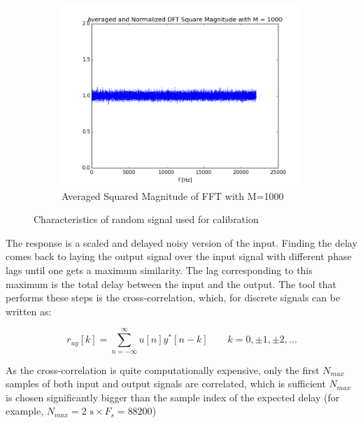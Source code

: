 \begin{figure}[H]
\begin{subfigure}[b]{0.6\linewidth}
        \includegraphics[width=\linewidth]{files/random_M1000.png}
        \caption{Averaged Squared Magnitude of FFT with M=1000}
        \label{fig:random_M1000}
    \end{subfigure}
	\caption{Characteristics of random signal used for calibration} 
	\label{fig:randomn}
\end{figure}
The response is a scaled and delayed noisy version of the input. Finding the delay comes back to laying the output signal over the input signal with different phase lags until one gets a maximum similarity. The lag corresponding to this maximum is the total delay between the input and the output. The tool that performs these steps is the cross-correlation, which, for discrete signals can be written as: 

\begin{equation}
	r_{uy}[k] = \sum\limits_{n=-\infty}^{\infty} u[n]y^*[n-k] \hspace{2em} k=0,\pm1,\pm2,...
\end{equation}

As the cross-correlation is quite computationally expensive, only the first $N_{max}$ samples of both input and output signals are correlated, which is sufficient $N_{max}$ is chosen significantly bigger than the sample index of the expected delay (for example, $N_{max}=2  \text{ s} \times F_s = 88200$)

